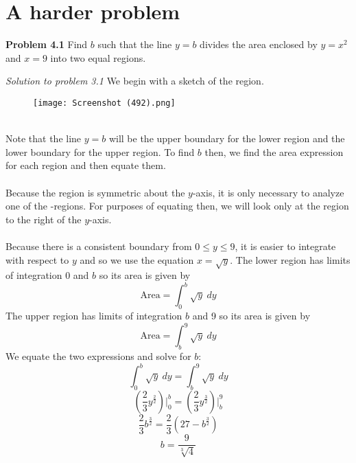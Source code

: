 \documentclass[11pt]{scrartcl}
\begin{document}
\section{A harder problem}
\begin{tcolorbox}[colback=purple!5!white,colframe=purple!75!black]
\textbf{Problem 4.1} Find $b$ such that the line $y=b$ divides the area enclosed by $y=x^2$ and $x=9$ into two equal regions.
\end{tcolorbox}
\noindent 
\textit{Solution to problem 3.1} We begin with a sketch of the region. 

\begin{figure}[htp]
    \centering
    \texttt{[image: Screenshot (492).png]}
\end{figure}
\\
\noindent 
Note that the line $y=b$ will be the upper boundary for the lower region and the lower boundary for the upper region. To find $b$ then, we find the area expression for each region and then equate them. \\
\\
\noindent 
Because the region is symmetric about the $y$-axis, it is only necessary to analyze one of the -regions. For purposes of equating then, we will look only at the region to the right of the $y$-axis. \\
\\
\noindent 
Because there is a consistent  boundary from $0 \le y \le 9$, it is easier to integrate with respect to $y$ and so we use the equation $x=\sqrt{y}$. The lower region has limits of integration $0$ and $b$ so its area is given by  
$$\text{Area}=\int_0^b \sqrt{y} \ dy$$
The upper region has limits of integration $b$ and 9 so its area is given by
$$\text{Area}=\int_b^9 \sqrt{y} \ dy$$
We equate the two expressions and solve for $b$: 
$$\int_0^b \sqrt{y} \ dy=\int_b^9 \sqrt{y} \ dy$$
$$\left(\frac{2}{3}y^\frac{2}{2}\right) \biggr \rvert_0^b=\left(\frac{2}{3}y^\frac{3}{2}\right) \biggr \rvert_b^9$$
$$\frac{2}{3}b^\frac{3}{2}=\frac{2}{3}(27-b^\frac{3}{2})$$
$$b=\frac{9}{\sqrt[3]{4}}$$
\noindent 
\end{document}
